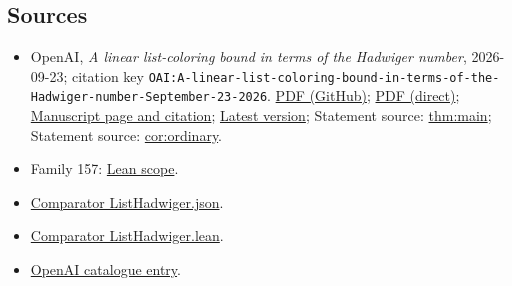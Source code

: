 \documentclass[11pt]{article}
\begin{document}
\subsection{Sources}
\begin{itemize}
\item OpenAI, \emph{A linear list-coloring bound in terms of the Hadwiger number}, 2026-09-23; citation key \texttt{OAI:A-linear-list-coloring-bound-in-terms-of-the-Hadwiger-number-September-23-2026}. \href{https://github.com/openai/math/blob/adc7f1241b42e322a6451854ab7e4b4c146bf78a/preprints/A-linear-list-coloring-bound-in-terms-of-the-Hadwiger-number-September-23-2026/paper.pdf}{PDF (GitHub)}; \href{https://github.com/openai/math/raw/adc7f1241b42e322a6451854ab7e4b4c146bf78a/preprints/A-linear-list-coloring-bound-in-terms-of-the-Hadwiger-number-September-23-2026/paper.pdf}{PDF (direct)}; \href{https://github.com/openai/math/blob/adc7f1241b42e322a6451854ab7e4b4c146bf78a/preprints/A-linear-list-coloring-bound-in-terms-of-the-Hadwiger-number-September-23-2026/README.md}{Manuscript page and citation}; \href{https://github.com/openai/math/blob/main/preprints/A-linear-list-coloring-bound-in-terms-of-the-Hadwiger-number-September-23-2026/paper.pdf}{Latest version}; Statement source: \href{https://github.com/openai/math/blob/adc7f1241b42e322a6451854ab7e4b4c146bf78a/preprints/A-linear-list-coloring-bound-in-terms-of-the-Hadwiger-number-September-23-2026/build/sections/01-introduction.tex\#L25}{thm:main}; Statement source: \href{https://github.com/openai/math/blob/adc7f1241b42e322a6451854ab7e4b4c146bf78a/preprints/A-linear-list-coloring-bound-in-terms-of-the-Hadwiger-number-September-23-2026/build/sections/01-introduction.tex\#L38}{cor:ordinary}.
\item Family 157: \href{https://github.com/openai/math/blob/adc7f1241b42e322a6451854ab7e4b4c146bf78a/lean/docs/157.md}{Lean scope}.
\item \href{https://github.com/openai/math/blob/adc7f1241b42e322a6451854ab7e4b4c146bf78a/lean/ComparatorChallenges/ListHadwiger.json}{Comparator ListHadwiger.json}.
\item \href{https://github.com/openai/math/blob/adc7f1241b42e322a6451854ab7e4b4c146bf78a/lean/ComparatorChallenges/ListHadwiger.lean}{Comparator ListHadwiger.lean}.
\item \href{https://github.com/openai/math/blob/adc7f1241b42e322a6451854ab7e4b4c146bf78a/CONTENTS.md}{OpenAI catalogue entry}.
\end{itemize}
\end{document}
